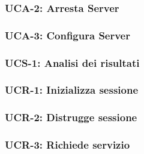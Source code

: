 \subsubsection{UCA-2: Arresta Server}

\clearpage

\subsubsection{UCA-3: Configura Server}

\clearpage

\subsubsection{UCS-1: Analisi dei risultati}

\clearpage

\subsubsection{UCR-1: Inizializza sessione}

\clearpage

\subsubsection{UCR-2: Distrugge sessione}

\clearpage

\subsubsection{UCR-3: Richiede servizio}

\clearpage




